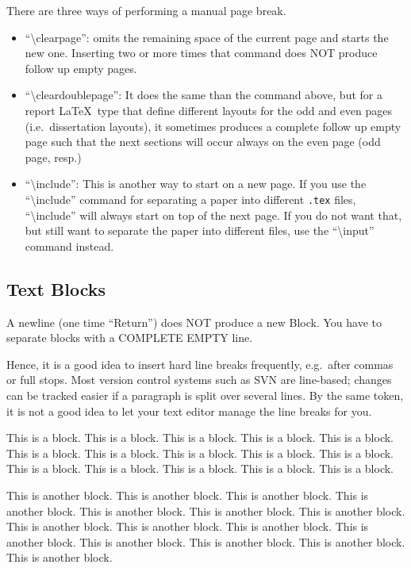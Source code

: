 There are three ways of performing a manual page break.
\begin{itemize}
  \item ``\textbackslash{}clearpage'': omits the remaining space of the
current page and starts the new one. Inserting two or more times that
command does NOT produce follow up empty pages.
  \item ``\textbackslash{}cleardoublepage'': It does the same than the
command above, but for a report \LaTeX\ type that define different
layouts for the odd and even pages (i.e.\ dissertation layouts), it
sometimes produces a complete follow up empty page such that the next
sections will occur always on the even page (odd page, resp.)
  \item ``\textbackslash{}include'': This is another way to start on a
new page. If you use the ``\textbackslash{}include''
command for separating a paper
into different \texttt{.tex} files,
``\textbackslash{}include'' will always start on
top of the next page. If you do not want that, but still want to
separate the paper into different files,
use the ``\textbackslash{}input''
command instead.
\end{itemize}

\clearpage

\cleardoublepage

\subsection{Text Blocks}

A newline (one time ``Return'') does NOT produce a new Block.
You have to separate blocks with a COMPLETE EMPTY line.

Hence, it is a good idea to insert hard line breaks frequently,
e.g.~after commas or full stops.
Most version control systems such as SVN are line-based;
changes can be tracked easier if a paragraph is split
over several lines.
By the same token, it is not a good idea to let your text editor
manage the line breaks for you.

This is a block. This is a block. This is a block. This is a block.
This is a block. This is a block. This is a block. This is a block.
This is a block. This is a block. This is a block. This is a block.
This is a block. This is a block. This is a block.

This is another block. This is another block. This is another block.
This is another block. This is another block. This is another block.
This is another block. This is another block. This is another block.
This is another block. This is another block. This is another block.
This is another block. This is another block. This is another block.

